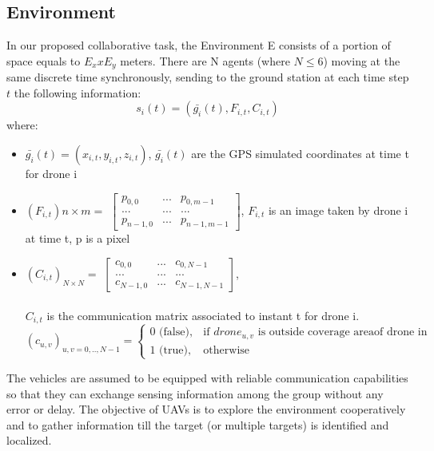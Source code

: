 \documentclass[LaM,binding=0.6cm]{sapthesis}
\begin{document}
\subsection*{Environment}
In our proposed collaborative task, the Environment E consists of a portion of space equals to $E_x x E_y$ meters. There are N agents (where $N\le6$) moving at the same discrete time synchronously, sending to the ground station at each time step $t$ the following information:
$$ s_i(t) = (\bar{g_{i}}(t),F_{i,t},C_{i,t})$$
where:
\begin{itemize}
	\item $\bar{g_{i}}(t) = (x_{i,t},y_{i,t},z_{i,t})$, $\bar{g_{i}}(t)$ are the GPS simulated coordinates at time t for drone i
	
	\item $(F_{i,t}){n\times m} = $ 
	$\begin{bmatrix}
		p_{0,0} & ... & p_{0,m-1} \\ ... & ... & ... \\ p_{n-1,0} & ... & p_{n-1,m-1} 
	\end{bmatrix}
	$, $F_{i,t} $ is an image taken by drone i at time t, p is a pixel
	
	\item $(C_{i,t})_{N\times N} = $ 
	$\begin{bmatrix}
	c_{0,0} & ... & c_{0,N-1} \\ ... & ... & ... \\ c_{N-1,0} & ... & c_{N-1,N-1} 
	\end{bmatrix}
	$,\\ \\
	 $C_{i,t} $ is the communication matrix associated to instant t for drone i.\\
	$(c_{u,v})_{u,v=0,..,N-1} = \begin{cases} 0 \mbox{ (false)}, & \mbox{if } drone_{u,v} \mbox{ is outside coverage areaof drone in} \\ 1 \mbox{ (true)}, & \mbox{otherwise}
	\end{cases}$
\end{itemize}

 The vehicles are assumed to be equipped with reliable
communication capabilities so that they can exchange sensing information among the group without any error or delay.
The objective of UAVs is to explore the environment cooperatively and to gather information till the target (or multiple targets) is identified and localized.
\end{document}
